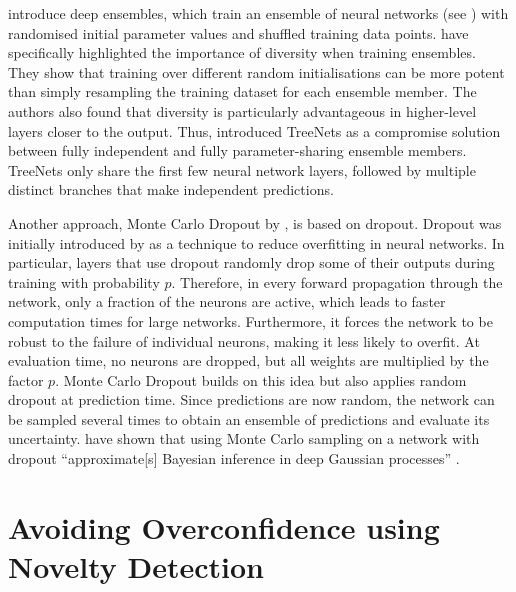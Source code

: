 \textcite{deep-ensembles-2017} introduce deep ensembles, which train an ensemble of neural networks (see ) with randomised initial parameter values and shuffled training data points. \textcite{ensemble-diversity-2015} have specifically highlighted the importance of diversity when training ensembles. They show that training over different random initialisations can be more potent than simply resampling the training dataset for each ensemble member. The authors also found that diversity is particularly advantageous in higher-level layers closer to the output. Thus, \citeauthor{ensemble-diversity-2015} introduced TreeNets as a compromise solution between fully independent and fully parameter-sharing ensemble members. TreeNets only share the first few neural network layers, followed by multiple distinct branches that make independent predictions.

Another approach, Monte Carlo Dropout by \textcite{mc-dropout-2016}, is based on dropout. Dropout was initially introduced by \textcite{dropout-2014} as a technique to reduce overfitting in neural networks. In particular, layers that use dropout randomly drop some of their outputs during training with probability $p$. Therefore, in every forward propagation through the network, only a fraction of the neurons are active, which leads to faster computation times for large networks. Furthermore, it forces the network to be robust to the failure of individual neurons, making it less likely to overfit. At evaluation time, no neurons are dropped, but all weights are multiplied by the factor $p$. Monte Carlo Dropout builds on this idea but also applies random dropout at prediction time. Since predictions are now random, the network can be sampled several times to obtain an ensemble of predictions and evaluate its uncertainty. \citeauthor{mc-dropout-2016} have shown that using Monte Carlo sampling on a network with dropout ``approximate[s] Bayesian inference in deep Gaussian processes'' \cite{mc-dropout-2016}.

\section{Avoiding Overconfidence using Novelty Detection} \label{txt:novelty-detection}

